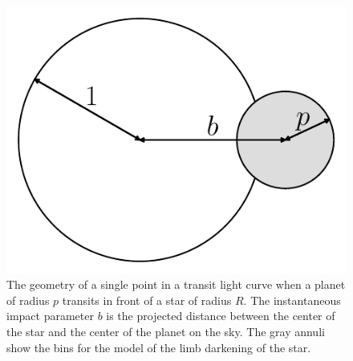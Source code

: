 \documentclass[12pt,preprint]{aastex}
\newcommand{\figlabel}[1]{\label{fig:#1}}
\begin{document}
\clearpage

\begin{figure}[htbp]
    \begin{center}
        \includegraphics[width=\textwidth]{figures/geom.pdf}
    \end{center}
    \caption{The geometry of a single point in a transit light curve when a
        planet of radius $p$ transits in front of a star of radius $R$. The
        instantaneous impact parameter $b$ is the projected distance between
        the center of the star and the center of the planet on the sky. The
        gray annuli show the bins for the model of the limb darkening of the
        star. \figlabel{geom}}
\end{figure}
\end{document}
